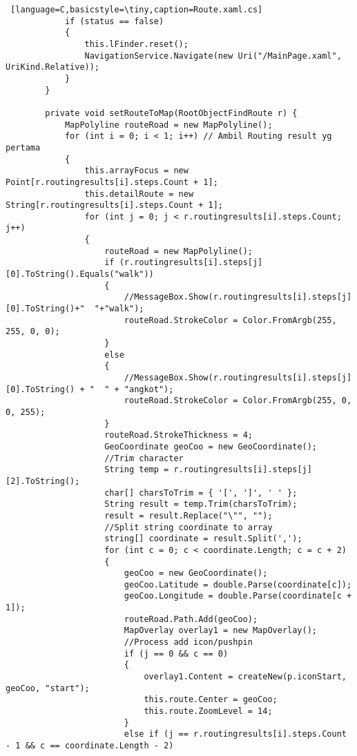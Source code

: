\begin{lstlisting} [language=C,basicstyle=\tiny,caption=Route.xaml.cs]
            if (status == false)
            {
                this.lFinder.reset();
                NavigationService.Navigate(new Uri("/MainPage.xaml", UriKind.Relative));
            }
        }

        private void setRouteToMap(RootObjectFindRoute r) {
            MapPolyline routeRoad = new MapPolyline();
            for (int i = 0; i < 1; i++) // Ambil Routing result yg pertama
            {
                this.arrayFocus = new Point[r.routingresults[i].steps.Count + 1];
                this.detailRoute = new String[r.routingresults[i].steps.Count + 1];
                for (int j = 0; j < r.routingresults[i].steps.Count; j++)
                {
                    routeRoad = new MapPolyline();
                    if (r.routingresults[i].steps[j][0].ToString().Equals("walk"))
                    {
                        //MessageBox.Show(r.routingresults[i].steps[j][0].ToString()+"  "+"walk");
                        routeRoad.StrokeColor = Color.FromArgb(255, 255, 0, 0);
                    }
                    else
                    {
                        //MessageBox.Show(r.routingresults[i].steps[j][0].ToString() + "  " + "angkot");
                        routeRoad.StrokeColor = Color.FromArgb(255, 0, 0, 255);
                    }
                    routeRoad.StrokeThickness = 4;
                    GeoCoordinate geoCoo = new GeoCoordinate();
                    //Trim character
                    String temp = r.routingresults[i].steps[j][2].ToString();
                    char[] charsToTrim = { '[', ']', ' ' };
                    String result = temp.Trim(charsToTrim);
                    result = result.Replace("\"", "");
                    //Split string coordinate to array
                    string[] coordinate = result.Split(',');
                    for (int c = 0; c < coordinate.Length; c = c + 2)
                    {
                        geoCoo = new GeoCoordinate();
                        geoCoo.Latitude = double.Parse(coordinate[c]);
                        geoCoo.Longitude = double.Parse(coordinate[c + 1]);
                        routeRoad.Path.Add(geoCoo);
                        MapOverlay overlay1 = new MapOverlay();
                        //Process add icon/pushpin
                        if (j == 0 && c == 0)
                        {
                            overlay1.Content = createNew(p.iconStart, geoCoo, "start");
                            this.route.Center = geoCoo;
                            this.route.ZoomLevel = 14;
                        }
                        else if (j == r.routingresults[i].steps.Count - 1 && c == coordinate.Length - 2)

\end{lstlisting}
